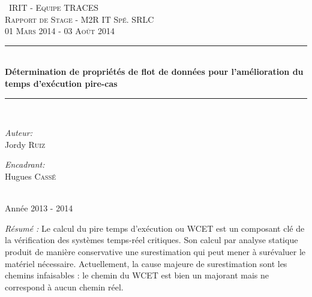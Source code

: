 \documentclass[french]{article}
\begin{document}
  \begin{titlepage}
  \newcommand{\HRule}{\rule{\linewidth}{0.5mm}}
  \begin{center}
    \textsc{\	 IRIT - Equipe TRACES}\\[0.35cm]
    \textsc{\Large Rapport de Stage - M2R IT Spé. SRLC}\\[0.3cm]
    \textsc{\large 01 Mars 2014 - 03 Août 2014}
    \HRule \\[0.4cm]
    { \huge \bfseries Détermination de propriétés de flot de données pour l'amélioration du temps d'exécution
    pire-cas}
    \HRule \\[0.4cm]
    \begin{minipage}{0.5\textwidth} \begin{flushleft} \large \emph{Auteur:}\\ Jordy \textsc{Ruiz} \end{flushleft} \end{minipage}\begin{minipage}{0.5\textwidth} \begin{flushright} \large \emph{Encadrant:} \\ Hugues \textsc{Cassé}\end{flushright} \end{minipage}\\
    {\large Année 2013 - 2014}\\[0.5cm]
  \end{center}
    \vfill

  {\textit{Résumé :}
    Le calcul du pire temps d'exécution ou WCET est un composant
    clé de la vérification des systèmes temps-réel critiques.
    Son calcul par analyse statique produit de manière conservative
    une surestimation qui peut mener à surévaluer le matériel nécessaire.
    Actuellement, la cause majeure de surestimation sont les chemins
    infaisables : le chemin du WCET est bien un majorant mais
    ne correspond à aucun chemin réel.

}
\end{titlepage}
\end{document}
